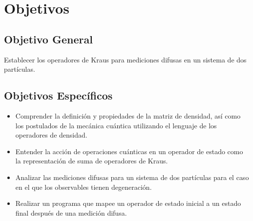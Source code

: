\section{Objetivos}

\subsection{Objetivo General}

Establecer los operadores de Kraus para mediciones difusas en un sistema de dos partículas. 


\subsection{Objetivos Específicos}
\begin{itemize}
	\item Comprender la definición y propiedades de la matriz de densidad, así como los postulados de la mecánica cuántica utilizando el lenguaje de los operadores de densidad.
	
	\item Entender la acción de operaciones cuánticas en un operador de estado como la representación de suma de operadores de Kraus. 

	\item Analizar las mediciones difusas para un sistema de dos partículas para el caso en el que los observables tienen degeneración.
	
	\item Realizar un programa que mapee un operador de estado inicial a un estado final después de una medición difusa.

	
	
\end{itemize}
